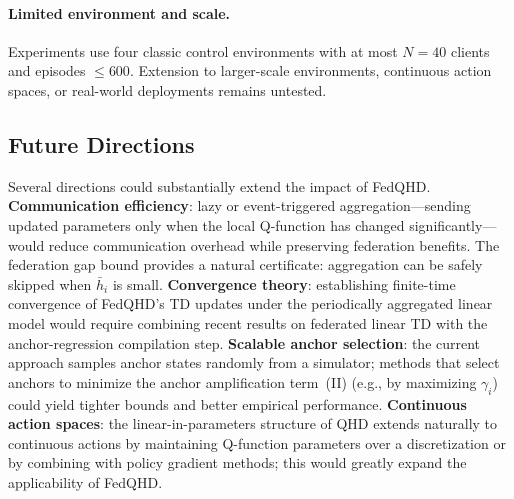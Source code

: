\paragraph{Limited environment and scale.}
Experiments use four classic control environments with at most $N=40$ clients and episodes $\leq 600$. Extension to larger-scale environments, continuous action spaces, or real-world deployments remains untested.

\subsection{Future Directions}
\label{subsec:future_work}

Several directions could substantially extend the impact of FedQHD. \textbf{Communication efficiency}: lazy or event-triggered aggregation—sending updated parameters only when the local Q-function has changed significantly—would reduce communication overhead while preserving federation benefits. The federation gap bound provides a natural certificate: aggregation can be safely skipped when $\bar{h}_i$ is small. \textbf{Convergence theory}: establishing finite-time convergence of FedQHD's TD updates under the periodically aggregated linear model would require combining recent results on federated linear TD \citep{bhandari2018finite,wang2024federated} with the anchor-regression compilation step. \textbf{Scalable anchor selection}: the current approach samples anchor states randomly from a simulator; methods that select anchors to minimize the anchor amplification term~(II) (e.g., by maximizing $\gamma_i$) could yield tighter bounds and better empirical performance. \textbf{Continuous action spaces}: the linear-in-parameters structure of QHD extends naturally to continuous actions by maintaining Q-function parameters over a discretization or by combining with policy gradient methods; this would greatly expand the applicability of FedQHD.
